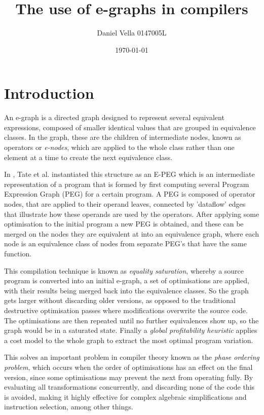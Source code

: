 \documentclass[11pt, a4paper]{article}
\title{\textbf{The use of e-graphs in compilers}}
\author{Daniel Vella 0147005L}
\date{\today}
\begin{document}
\maketitle

\section{Introduction}
An e-graph is a directed graph designed to represent several equivalent expressions, composed of smaller identical values 
that are grouped in equivalence classes. In the graph, these are the children of intermediate nodes, known as operators or 
\textit{e-nodes}, which are applied to the whole class rather than one element at a time to create the next equivalence class.

\smallskip

In \cite{tate2011}, Tate et al. instantiated this structure as an E-PEG which is an intermediate representation of a program that is formed by first computing 
several Program Expression Graph (PEG) for a certain program. A PEG is composed of operator nodes, that are applied to 
their operand leaves, connected by 'dataflow' edges that illustrate how these operands are used by the operators.  
After applying some optimisation to the initial program a new PEG is obtained, and these can be merged on the nodes they are equivalent
at into an equivalence graph, where each node is an equivalence class of nodes from separate PEG's that have the same function.

\smallskip

This compilation technique is known as \emph{equality saturation}, whereby a source program is converted into an initial e-graph,
a set of optimisations are applied, with their results being merged back into the equivalence classes. So the graph gets larger without discarding
older versions, as opposed to the traditional destructive optimisation passes where modifications overwrite the source code. The optimisations
are then repeated until no further equivalences show up, so the graph would be in a saturated state. Finally a \emph{global profitability heuristic}
applies a cost model to the whole graph to extract the most optimal program variation.

\smallskip

This solves an important problem in compiler theory known as the \emph{phase ordering problem}, which occurs when the order of optimisations
has an effect on the final version, since some optimisations may prevent the next from operating fully. By evaluating all transformations concurrently,
and discarding none of the code this is avoided, making it highly effective for complex algebraic simplifications and instruction selection, among other things.
\end{document}
